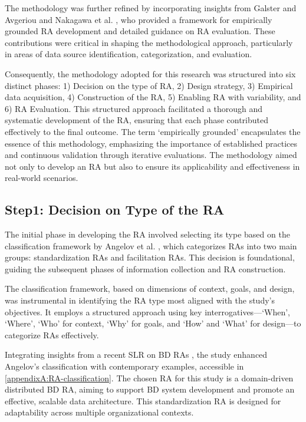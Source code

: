\documentclass[review]{elsarticle}
\begin{document}
The methodology was further refined by incorporating insights from Galster and Avgeriou \cite{galster2011empirically} and Nakagawa et al. \cite{nakagawa2014consolidating}, who provided a framework for empirically grounded RA development and detailed guidance on RA evaluation. These contributions were critical in shaping the methodological approach, particularly in areas of data source identification, categorization, and evaluation.

Consequently, the methodology adopted for this research was structured into six distinct phases: 1) Decision on the type of RA, 2) Design strategy, 3) Empirical data acquisition, 4) Construction of the RA, 5) Enabling RA with variability, and 6) RA Evaluation. This structured approach facilitated a thorough and systematic development of the RA, ensuring that each phase contributed effectively to the final outcome. The term `empirically grounded' encapsulates the essence of this methodology, emphasizing the importance of established practices and continuous validation through iterative evaluations. The methodology aimed not only to develop an RA but also to ensure its applicability and effectiveness in real-world scenarios.



\subsection{Step1: Decision on Type of the RA}

The initial phase in developing the RA involved selecting its type based on the classification framework by Angelov et al. \cite{angelov2009classification}, which categorizes RAs into two main groups: standardization RAs and facilitation RAs. This decision is foundational, guiding the subsequent phases of information collection and RA construction. 

The classification framework, based on dimensions of context, goals, and design, was instrumental in identifying the RA type most aligned with the study's objectives. It employs a structured approach using key interrogatives—‘When’, ‘Where’, ‘Who’ for context, ‘Why’ for goals, and ‘How’ and ‘What’ for design—to categorize RAs effectively.

Integrating insights from a recent SLR on BD RAs \cite{AtaeiACIS}, the study enhanced Angelov's classification with contemporary examples, accessible in \ref{appendixA:RA-classification}. The chosen RA for this study is a domain-driven distributed BD RA, aiming to support BD system development and promote an effective, scalable data architecture. This standardization RA is designed for adaptability across multiple organizational contexts.
\end{document}
